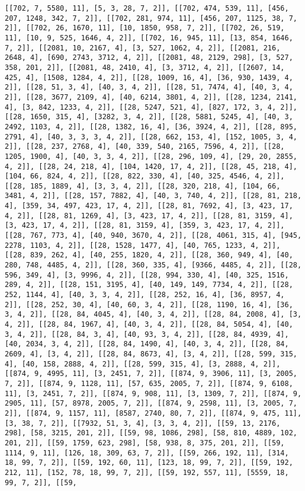 \documentclass[12pt,fleqn]{article}\usepackage{../../common}
\begin{document}
\begin{verbatim}
[[702, 7, 5580, 11], [5, 3, 28, 7, 2]], [[702, 474, 539, 11], [456, 207, 1248, 342, 7, 2]], [[702, 281, 974, 11], [456, 207, 1125, 38, 7, 2]], [[702, 26, 1670, 11], [10, 1850, 958, 7, 2]], [[702, 26, 519, 11], [10, 9, 525, 1646, 4, 2]], [[702, 16, 945, 11], [13, 854, 1646, 7, 2]], [[2081, 10, 2167, 4], [3, 527, 1062, 4, 2]], [[2081, 216, 2648, 4], [690, 2743, 3712, 4, 2]], [[2081, 48, 2129, 298], [3, 527, 358, 201, 2]], [[2081, 48, 2410, 4], [3, 3712, 4, 2]], [[2607, 14, 425, 4], [1508, 1284, 4, 2]], [[28, 1009, 16, 4], [36, 930, 1439, 4, 2]], [[28, 51, 3, 4], [40, 3, 4, 2]], [[28, 51, 7474, 4], [40, 3, 4, 2]], [[28, 3677, 2109, 4], [40, 6214, 3801, 4, 2]], [[28, 1234, 2141, 4], [3, 842, 1233, 4, 2]], [[28, 5247, 521, 4], [827, 172, 3, 4, 2]], [[28, 1650, 315, 4], [3282, 3, 4, 2]], [[28, 5881, 5245, 4], [40, 3, 2492, 1103, 4, 2]], [[28, 1382, 16, 4], [36, 3924, 4, 2]], [[28, 895, 2791, 4], [40, 3, 3, 3, 4, 2]], [[28, 662, 153, 4], [152, 1005, 3, 4, 2]], [[28, 237, 2768, 4], [40, 339, 540, 2165, 7596, 4, 2]], [[28, 1205, 1900, 4], [40, 3, 3, 4, 2]], [[28, 296, 109, 4], [29, 20, 2855, 4, 2]], [[28, 24, 218, 4], [104, 1420, 17, 4, 2]], [[28, 45, 218, 4], [104, 66, 824, 4, 2]], [[28, 822, 330, 4], [40, 325, 4546, 4, 2]], [[28, 185, 1889, 4], [3, 3, 4, 2]], [[28, 320, 218, 4], [104, 66, 3481, 4, 2]], [[28, 157, 7882, 4], [40, 3, 740, 4, 2]], [[28, 81, 218, 4], [359, 34, 497, 423, 17, 4, 2]], [[28, 81, 7692, 4], [3, 423, 17, 4, 2]], [[28, 81, 1269, 4], [3, 423, 17, 4, 2]], [[28, 81, 3159, 4], [3, 423, 17, 4, 2]], [[28, 81, 3159, 4], [359, 3, 423, 17, 4, 2]], [[28, 767, 773, 4], [40, 940, 3670, 4, 2]], [[28, 4061, 315, 4], [945, 2278, 1103, 4, 2]], [[28, 1528, 1477, 4], [40, 765, 1233, 4, 2]], [[28, 839, 262, 4], [40, 255, 1820, 4, 2]], [[28, 360, 949, 4], [40, 280, 748, 4485, 4, 2]], [[28, 360, 335, 4], [9366, 4485, 4, 2]], [[28, 596, 349, 4], [3, 9996, 4, 2]], [[28, 994, 330, 4], [40, 325, 1516, 289, 4, 2]], [[28, 151, 3195, 4], [40, 149, 149, 7734, 4, 2]], [[28, 252, 1144, 4], [40, 3, 3, 4, 2]], [[28, 252, 16, 4], [36, 8957, 4, 2]], [[28, 252, 30, 4], [40, 60, 3, 4, 2]], [[28, 1190, 16, 4], [36, 3, 4, 2]], [[28, 84, 4045, 4], [40, 3, 4, 2]], [[28, 84, 2008, 4], [3, 4, 2]], [[28, 84, 1967, 4], [40, 3, 4, 2]], [[28, 84, 5054, 4], [40, 3, 4, 2]], [[28, 84, 3, 4], [40, 93, 3, 4, 2]], [[28, 84, 4939, 4], [40, 2034, 3, 4, 2]], [[28, 84, 1490, 4], [40, 3, 4, 2]], [[28, 84, 2609, 4], [3, 4, 2]], [[28, 84, 8673, 4], [3, 4, 2]], [[28, 599, 315, 4], [40, 158, 2888, 4, 2]], [[28, 599, 315, 4], [3, 2888, 4, 2]], [[874, 9, 4995, 11], [3, 2451, 7, 2]], [[874, 9, 3906, 11], [3, 2005, 7, 2]], [[874, 9, 1128, 11], [57, 635, 2005, 7, 2]], [[874, 9, 6108, 11], [3, 2451, 7, 2]], [[874, 9, 908, 11], [3, 1309, 7, 2]], [[874, 9, 2905, 11], [57, 8978, 2005, 7, 2]], [[874, 9, 2598, 11], [3, 2005, 7, 2]], [[874, 9, 1157, 11], [8587, 2740, 80, 7, 2]], [[874, 9, 475, 11], [3, 38, 7, 2]], [[7932, 51, 3, 4], [3, 3, 4, 2]], [[59, 13, 2176, 298], [58, 3215, 201, 2]], [[59, 98, 1086, 298], [58, 810, 4889, 102, 201, 2]], [[59, 1759, 623, 298], [58, 938, 8, 375, 201, 2]], [[59, 1114, 9, 11], [126, 18, 309, 63, 7, 2]], [[59, 266, 192, 11], [314, 18, 99, 7, 2]], [[59, 192, 60, 11], [123, 18, 99, 7, 2]], [[59, 192, 212, 11], [152, 78, 18, 99, 7, 2]], [[59, 192, 557, 11], [5559, 18, 99, 7, 2]], [[59, 
\end{verbatim}
\end{document}
